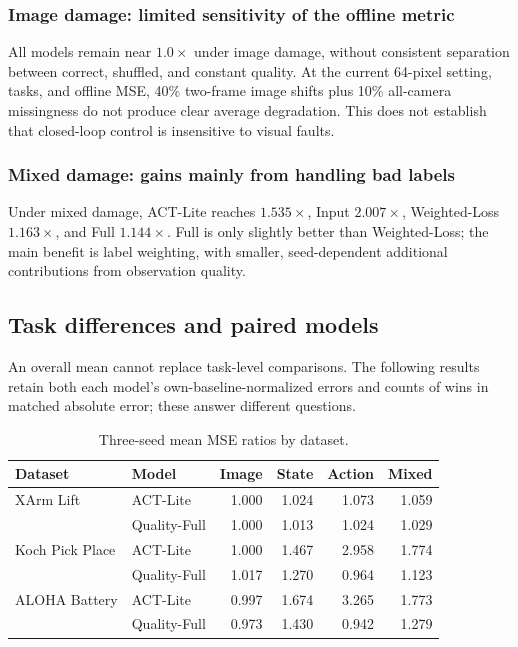 \documentclass[11pt,a4paper]{article}
\begin{document}
\subsubsection{Image damage: limited sensitivity of the offline metric}

All models remain near $1.0\times$ under image damage, without consistent separation between correct, shuffled, and constant quality. At the current 64-pixel setting, tasks, and offline MSE, 40\% two-frame image shifts plus 10\% all-camera missingness do not produce clear average degradation. This does not establish that closed-loop control is insensitive to visual faults.

\subsubsection{Mixed damage: gains mainly from handling bad labels}

Under mixed damage, ACT-Lite reaches $1.535\times$, Input $2.007\times$, Weighted-Loss $1.163\times$, and Full $1.144\times$. Full is only slightly better than Weighted-Loss; the main benefit is label weighting, with smaller, seed-dependent additional contributions from observation quality.
\clearpage\subsection{Task differences and paired models}
An overall mean cannot replace task-level comparisons. The following results retain both each model's own-baseline-normalized errors and counts of wins in matched absolute error; these answer different questions.

\begin{table}[H]
\centering
\scriptsize
\begin{tabular}{p{32mm}p{31mm}rrrr}
\toprule
Dataset & Model & Image & State & Action & Mixed\\
\midrule
XArm Lift & ACT-Lite & 1.000 & 1.024 & 1.073 & 1.059\\
 & Quality-Full & 1.000 & 1.013 & 1.024 & 1.029\\
Koch Pick Place & ACT-Lite & 1.000 & 1.467 & 2.958 & 1.774\\
 & Quality-Full & 1.017 & 1.270 & 0.964 & 1.123\\
ALOHA Battery & ACT-Lite & 0.997 & 1.674 & 3.265 & 1.773\\
 & Quality-Full & 0.973 & 1.430 & 0.942 & 1.279\\
\bottomrule
\end{tabular}
\caption{Three-seed mean MSE ratios by dataset.}
\end{table}
\end{document}
